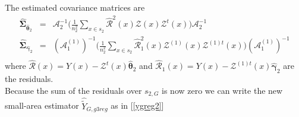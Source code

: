 \documentclass[a4paper,12pt,leqno, titlepage]{article}
\begin{document}
The estimated covariance matrices are
\begin{eqnarray}\label{robustvar3}
\hat{\pmb{\Sigma}}_{\hat{\pmb{\theta}}_2}&=&\pmb{\mathcal{A}}_2^{-1}
\Big(\frac{1}{n_2^2}\sum_{x\in{s_2}}\hat{\mathcal{R}}^2(x)\pmb{\mathcal{Z}}(x)
\pmb{\mathcal{Z}}^t(x)\Big)\pmb{\mathcal{A}}_2^{-1} \nonumber \\
\hat{\pmb{\Sigma}}_{\hat{\pmb{\gamma}}_2}&=&(\pmb{\mathcal{A}}^{(1)}_1)^{-1}
\Big(\frac{1}{n_2^2}\sum_{x\in{s_2}}\hat{\mathcal{R}}_1^2(x)\pmb{\mathcal{Z}}^{(1)}(x)
\pmb{\mathcal{Z}}^{(1)t}(x)\Big)(\pmb{\mathcal{A}}^{(1)}_1)^{-1} \nonumber \\
\end{eqnarray}
\noindent
where $\hat{\mathcal{R}}(x)=Y(x)-\pmb{\mathcal{Z}}^t(x)\hat{\pmb{\theta}}_2$ and
$\hat{\mathcal{R}}_1(x)=Y(x)-\pmb{\mathcal{Z}}^{(1)t}(x)\hat{\pmb{\gamma}}_2$ are the residuals. \\

\noindent Because the sum of the residuals over $s_{2,G}$ is now zero we can write the new small-area estimator $\hat{\tilde{Y}}_{G,g3reg}$ as in [\ref{ygreg2}]
\end{document}
